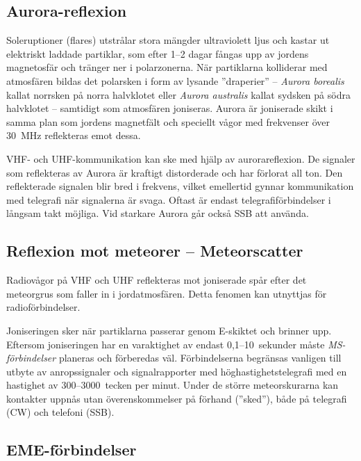 \subsection{Aurora-reflexion}

Soleruptioner (flares) utstrålar stora mängder ultraviolett ljus och kastar ut
elektriskt laddade partiklar, som efter 1--2 dagar fångas upp av jordens
magnetosfär och tränger ner i polarzonerna.
När partiklarna kolliderar med atmosfären bildas det polarsken i form av lysande
''draperier'' -- \emph{Aurora borealis} kallat norrsken på norra halvklotet
eller \emph{Aurora australis} kallat sydsken på södra halvklotet -- samtidigt
som atmosfären joniseras.
Aurora är joniserade skikt i samma plan som jordens magnetfält och speciellt
vågor med frekvenser över \SI{30}{\mega\hertz} reflekteras emot dessa.

VHF- och UHF-kommunikation kan ske med hjälp av aurorareflexion.
De signaler som reflekteras av Aurora är kraftigt distorderade och har förlorat
all ton.
Den reflekterade signalen blir bred i frekvens, vilket emellertid gynnar
kommunikation med telegrafi när signalerna är svaga.
Oftast är endast telegrafiförbindelser i långsam takt möjliga.
Vid starkare Aurora går också SSB att använda.

\subsection{Reflexion mot meteorer -- Meteorscatter}

Radiovågor på VHF och UHF reflekteras mot joniserade spår efter det
meteorgrus som faller in i jordatmosfären.
Detta fenomen kan utnyttjas för radioförbindelser.

Joniseringen sker när partiklarna passerar genom E-skiktet och brinner upp.
Eftersom joniseringen har en varaktighet av endast 0,1--10~sekunder måste
\emph{MS-förbindelser} planeras och förberedas väl.
Förbindelserna begränsas vanligen till utbyte av anropssignaler och
signalrapporter med höghastighetstelegrafi med en hastighet av
300--3000~tecken per minut.
Under de större meteorskurarna kan kontakter uppnås utan överenskommelser på
förhand (''sked''), både på telegrafi (CW) och telefoni (SSB).

\subsection{EME-förbindelser}

